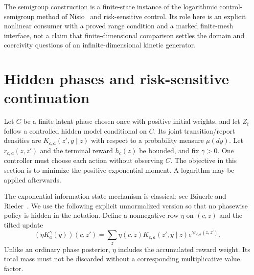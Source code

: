 The semigroup construction is a finite-state instance of the
logarithmic control-semigroup method of Nisio~\cite{Nisio1976} and risk-sensitive
control. Its role here is an explicit nonlinear consumer with a
proved range condition and a marked finite-mesh interface, not a
claim that finite-dimensional comparison settles the domain and
coercivity questions of an infinite-dimensional kinetic generator.

\section{Hidden phases and risk-sensitive continuation}
\label{sec:v10-phases}

Let $C$ be a finite latent phase chosen once with positive initial
weights, and let $Z_t$ follow a controlled hidden model conditional
on $C$. Its joint transition/report densities are
$K_{c,a}(z',y\mid z)$ with respect to a probability measure $\mu(dy)$.
Let $r_{c,a}(z,z')$ and the terminal reward $h_c(z)$ be bounded, and
fix $\gamma>0$. One controller must choose each action without
observing $C$. The objective in this section is to minimize the
positive exponential moment. A logarithm may be applied afterwards.

The exponential information-state mechanism is classical; see
B\"auerle and Rieder~\cite{BauerleRieder2017}. We use the following
explicit unnormalized version so that no phasewise policy is hidden
in the notation. Define a nonnegative row $\eta$ on $(c,z)$ and the tilted update
\begin{equation}\label{eq:v10-tilt}
 (\eta K_a^\gamma(y))(c,z')
 =\sum_z\eta(c,z)K_{c,a}(z',y\mid z)
                         e^{\gamma r_{c,a}(z,z')}.
\end{equation}
Unlike an ordinary phase posterior, $\eta$ includes the accumulated
reward weight. Its total mass must not be discarded without a
corresponding multiplicative value factor.

